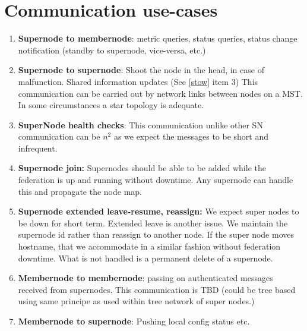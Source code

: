 \documentclass[oneside,12pt]{memoir}
\begin{document}
\section{Communication use-cases}
\label{commcases}



\begin{enumerate}
\item \textbf{Supernode to membernode}: metric queries, status queries, status change notification (standby to supernode, vice-versa, etc.)
\item \textbf{Supernode to supernode}: Shoot the node in the head, in case of malfunction.  Shared information updates (See \ref{stow} item 3)  This communication can be carried out by network links between nodes on a MST.   In some circumstances a star topology is adequate.  
\item \textbf{SuperNode health checks}:  This communication unlike other SN communication can be $n^2$ as we expect the messages to be short and infrequent.   
\item \textbf{Supernode join:}  Supernodes should be able to be added while the federation is up and running without downtime.  Any supernode can handle this and propagate the node map.

\item \textbf{Supernode extended leave-resume, reassign:}  We expect super nodes to be down for short term.  Extended leave is another issue. We maintain the supernode id rather than reassign to another node.  If the super node moves hostname, that we accommodate in a similar fashion without federation downtime.  What is not handled is a permanent delete of a supernode.  


\item \textbf{Membernode to membernode}: passing on authenticated messages received from supernodes.  This communication is TBD (could be tree based using same principe as used within tree network of super nodes.) %
\item \textbf{Membernode to supernode}: Pushing local config status etc.
\end{enumerate}
\end{document}
